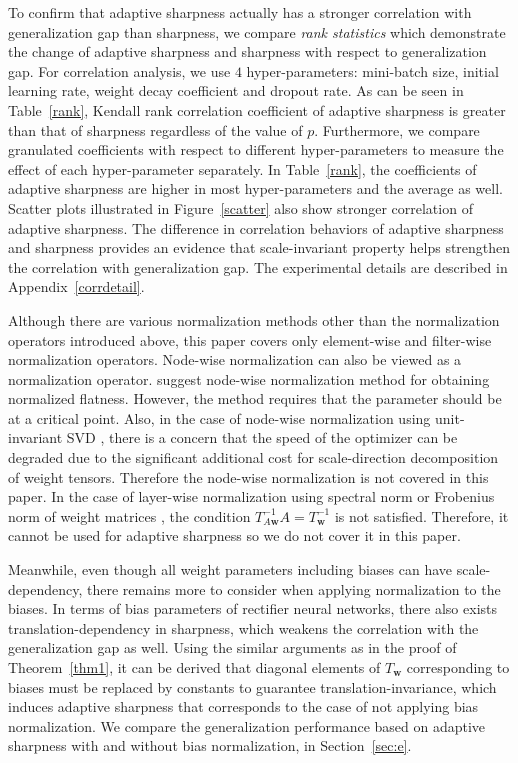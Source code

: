 \documentclass{article}
\newcommand{\mf}[1]{\mathbf{#1}}
\begin{document}
To confirm that adaptive sharpness actually has a stronger correlation with generalization gap than sharpness, we compare \textit{rank statistics} which demonstrate the change of adaptive sharpness and sharpness with respect to generalization gap. For correlation analysis, we use $4$ hyper-parameters: mini-batch size, initial learning rate, weight decay coefficient and dropout rate. As can be seen in Table~\ref{rank}, Kendall rank correlation coefficient \citep{kendall} of adaptive sharpness is greater than that of sharpness regardless of the value of $p$. Furthermore, we compare granulated coefficients \citep{jiang2019fantastic} with respect to different hyper-parameters to measure the effect of each hyper-parameter separately. In Table~\ref{rank}, the coefficients of adaptive sharpness are higher in most hyper-parameters and the average as well. Scatter plots illustrated in Figure~\ref{scatter} also show stronger correlation of adaptive sharpness. The difference in correlation behaviors of adaptive sharpness and sharpness provides an evidence that scale-invariant property helps strengthen the correlation with generalization gap. The experimental details are described in Appendix~\ref{corrdetail}.

Although there are various normalization methods other than the normalization operators introduced above, this paper covers only element-wise and filter-wise normalization operators. Node-wise normalization can also be viewed as a normalization operator. \citet{tsuzuku2020normalized} suggest node-wise normalization method for obtaining normalized flatness. However, the method requires that the parameter should be at a critical point. Also, in the case of node-wise normalization using unit-invariant SVD \citep{uhlmann2018generalized}, there is a concern that the speed of the optimizer can be degraded due to the significant additional cost for scale-direction decomposition of weight tensors. Therefore the node-wise normalization is not covered in this paper. In the case of layer-wise normalization using spectral norm or Frobenius norm of weight matrices \citep{neyshabur2017exploring}, the condition $T_{A\mf{w}}^{-1}A=T_\mf{w}^{-1}$ is not satisfied. Therefore, it cannot be used for adaptive sharpness so we do not cover it in this paper. 

Meanwhile, even though all weight parameters including biases can have scale-dependency, there remains more to consider when applying normalization to the biases. In terms of bias parameters of rectifier neural networks, there also exists translation-dependency in sharpness, which weakens the correlation with the generalization gap as well. Using the similar arguments as in the proof of Theorem~\ref{thm1}, it can be derived that diagonal elements of $T_{\mf{w}}$ corresponding to biases must be replaced by constants to guarantee translation-invariance, which induces adaptive sharpness that corresponds to the case of not applying bias normalization. We compare the generalization performance based on adaptive sharpness with and without bias normalization, in Section~\ref{sec:e}.
\end{document}
